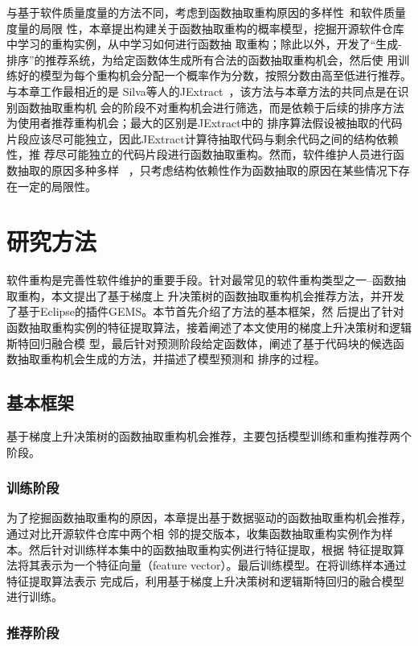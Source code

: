 与基于软件质量度量的方法不同，考虑到函数抽取重构原因的多样性~\cite{silva2016we}和软件质量度量的局限
性，本章提出构建关于函数抽取重构的概率模型，挖掘开源软件仓库中学习的重构实例，从中学习如何进行函数抽
取重构；除此以外，开发了``生成-排序''的推荐系统，为给定函数体生成所有合法的函数抽取重构机会，然后使
用训练好的模型为每个重构机会分配一个概率作为分数，按照分数由高至低进行推荐。与本章工作最相近的是
Silva等人的JExtract~\cite{silva:ICPC14,silva:CoRR15}，该方法与本章方法的共同点是在识别函数抽取重构机
会的阶段不对重构机会进行筛选，而是依赖于后续的排序方法为使用者推荐重构机会；最大的区别是JExtract中的
排序算法假设被抽取的代码片段应该尽可能独立，因此JExtract计算待抽取代码与剩余代码之间的结构依赖性，推
荐尽可能独立的代码片段进行函数抽取重构。然而，软件维护人员进行函数抽取的原因多种多样
~\cite{silva2016we}，只考虑结构依赖性作为函数抽取的原因在某些情况下存在一定的局限性。

\section{研究方法}
软件重构是完善性软件维护的重要手段。针对最常见的软件重构类型之一--函数抽取重构，本文提出了基于梯度上
升决策树的函数抽取重构机会推荐方法，并开发了基于Eclipse的插件GEMS。本节首先介绍了方法的基本框架，然
后提出了针对函数抽取重构实例的特征提取算法，接着阐述了本文使用的梯度上升决策树和逻辑斯特回归融合模
型，最后针对预测阶段给定函数体，阐述了基于代码块的候选函数抽取重构机会生成的方法，并描述了模型预测和
排序的过程。

\subsection{基本框架}
基于梯度上升决策树的函数抽取重构机会推荐，主要包括模型训练和重构推荐两个阶段。

\subsubsection{训练阶段}

为了挖掘函数抽取重构的原因，本章提出基于数据驱动的函数抽取重构机会推荐，通过对比开源软件仓库中两个相
邻的提交版本，收集函数抽取重构实例作为样本。然后针对训练样本集中的函数抽取重构实例进行特征提取，根据
特征提取算法将其表示为一个特征向量（feature vector）。最后训练模型。在将训练样本通过特征提取算法表示
完成后，利用基于梯度上升决策树和逻辑斯特回归的融合模型进行训练。


\subsubsection{推荐阶段}

